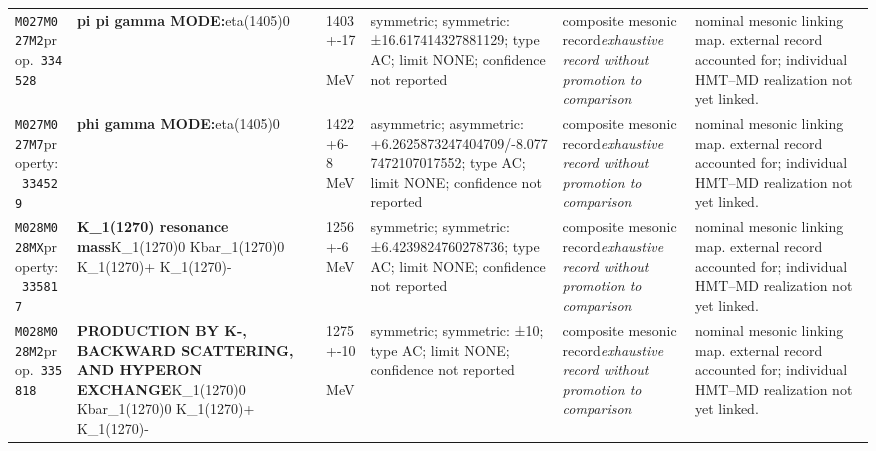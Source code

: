 \begin{landscape}
\begin{longtable}{L{1.85cm}L{4.45cm}L{2.35cm}L{4.05cm}L{3.35cm}L{7.15cm}}
\texttt{M027}\newline \texttt{M027M2}\newline prop.\ \texttt{334528} & \textbf{pi pi gamma MODE:}\newline eta(1405)0 & 1403+-17\,MeV & symmetric; symmetric: ±16.617414327881129; type AC; limit NONE; confidence not reported & composite mesonic record\newline \emph{exhaustive record without promotion to comparison} & nominal mesonic linking map. external record accounted for; individual HMT--MD realization not yet linked. \\
\texttt{M027}\newline \texttt{M027M7}\newline property:\ \texttt{334529} & \textbf{phi gamma MODE:}\newline eta(1405)0 & 1422+6-8\,MeV & asymmetric; asymmetric: +6.2625873247404709/-8.0777472107017552; type AC; limit NONE; confidence not reported & composite mesonic record\newline \emph{exhaustive record without promotion to comparison} & nominal mesonic linking map. external record accounted for; individual HMT--MD realization not yet linked. \\
\texttt{M028}\newline \texttt{M028MX}\newline property:\ \texttt{335817} & \textbf{K\_\allowbreak{}1(1270) resonance mass}\newline K\_\allowbreak{}1(1270)0 \textbar{}\allowbreak{} Kbar\_\allowbreak{}1(1270)0 \textbar{}\allowbreak{} K\_\allowbreak{}1(1270)+ \textbar{}\allowbreak{} K\_\allowbreak{}1(1270)- & 1256+-6\,MeV & symmetric; symmetric: ±6.4239824760278736; type AC; limit NONE; confidence not reported & composite mesonic record\newline \emph{exhaustive record without promotion to comparison} & nominal mesonic linking map. external record accounted for; individual HMT--MD realization not yet linked. \\
\texttt{M028}\newline \texttt{M028M2}\newline prop.\ \texttt{335818} & \textbf{PRODUCTION BY K-, BACKWARD SCATTERING, AND HYPERON EXCHANGE}\newline K\_\allowbreak{}1(1270)0 \textbar{}\allowbreak{} Kbar\_\allowbreak{}1(1270)0 \textbar{}\allowbreak{} K\_\allowbreak{}1(1270)+ \textbar{}\allowbreak{} K\_\allowbreak{}1(1270)- & 1275+-10\,MeV & symmetric; symmetric: ±10; type AC; limit NONE; confidence not reported & composite mesonic record\newline \emph{exhaustive record without promotion to comparison} & nominal mesonic linking map. external record accounted for; individual HMT--MD realization not yet linked. \\

\end{longtable}
\end{landscape}
